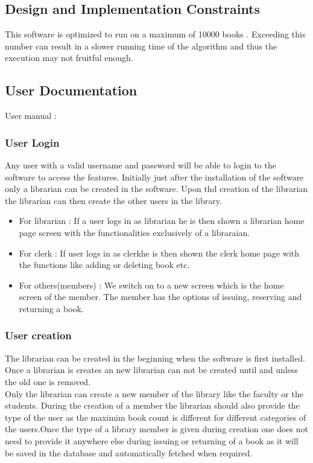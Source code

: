 \documentclass{article}
\begin{document}
\subsection{Design and Implementation Constraints}
This software is optimized to run on a maximum of 10000 books .
Exceeding this number can result in a slower running time of the algorithm and thus the execution may not fruitful enough.

\subsection{User Documentation}
User manual $:$

\subsubsection*{User Login}
Any user with a valid username and password will be able to login to the software to access the features. Initially just after the installation of the software only a librarian can be created in the software. Upon thd creation of the librarian the librarian can then create the other users in the library.
\begin{itemize}
\item For librarian : If a user logs in as librarian he is then shown a librarian home page screen with the functionalities exclusively of a libraraian.
\item For clerk : If user logs in as clerkhe is then shown the clerk home page with the functions like adding or deleting book etc.
\item For others(members) : We switch on to a new screen which is the home screen of the member. The member has the options of issuing, reserving and returning a book.
\end{itemize}

\subsubsection*{User creation}
The librarian can be created in the beginning when the software is first installed. Once a librarian is creates an new librarian can not be created until and unless the old one is removed.
\\
Only the librarian can create a new member of the library like the faculty or the students.
During the creation of a member the librarian should also provide the type of the user as the maximim book count is different for different categories of the users.Once the type of a library member is given during creation one does not need to provide it anywhere else during issuing or returning of a book as it will be saved in the database and automatically fetched when required.
\end{document}
